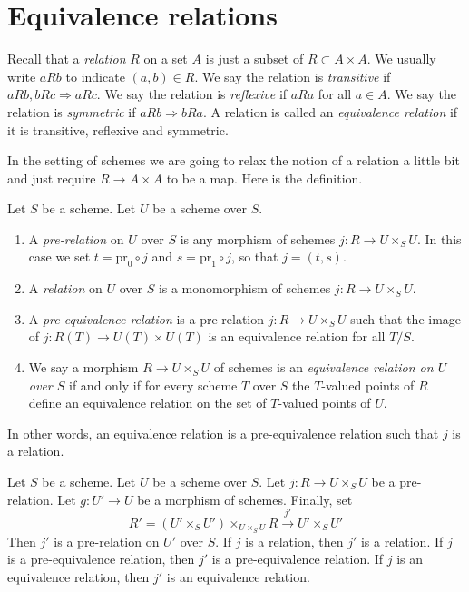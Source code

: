 \section{Equivalence relations}
\label{section-equivalence-relations}

\noindent
Recall that a {\it relation} $R$ on a set $A$ is just a subset
of $R \subset A \times A$. We usually write $a R b$ to indicate
$(a, b) \in R$. We say the relation is {\it transitive} if
$a R b, b R c \Rightarrow a R c$. We say the relation is
{\it reflexive} if $a R a$ for all $a \in A$. We say the relation is
{\it symmetric} if $a R b \Rightarrow b R a$.
A relation is called an {\it equivalence relation} if
it is transitive, reflexive and symmetric.

\medskip\noindent
In the setting of schemes we are going to relax the notion of a
relation a little bit and just require $R \to A \times A$ to
be a map. Here is the definition.

\begin{definition}
\label{definition-equivalence-relation}
Let $S$ be a scheme. Let $U$ be a scheme over $S$.
\begin{enumerate}
\item A {\it pre-relation} on $U$ over $S$ is any morphism
of schemes $j : R \to U \times_S U$. In this case we set
$t = \text{pr}_0 \circ j$ and $s = \text{pr}_1 \circ j$, so
that $j = (t, s)$.
\item A {\it relation} on $U$ over $S$ is a monomorphism
of schemes $j : R \to U \times_S U$.
\item A {\it pre-equivalence relation} is a pre-relation
$j : R \to U \times_S U$ such that the image of
$j : R(T) \to U(T) \times U(T)$ is an equivalence relation for
all $T/S$.
\item We say a morphism $R \to U \times_S U$ of schemes is
an {\it equivalence relation on $U$ over $S$}
if and only if for every scheme $T$ over $S$ the $T$-valued
points of $R$ define an equivalence relation
on the set of $T$-valued points of $U$.
\end{enumerate}
\end{definition}

\noindent
In other words, an equivalence relation is a pre-equivalence relation
such that $j$ is a relation.

\begin{lemma}
\label{lemma-restrict-relation}
Let $S$ be a scheme.
Let $U$ be a scheme over $S$.
Let $j : R \to U \times_S U$ be a pre-relation.
Let $g : U' \to U$ be a morphism of schemes.
Finally, set
$$
R' = (U' \times_S U')\times_{U \times_S U} R
\xrightarrow{j'}
U' \times_S U'
$$
Then $j'$ is a pre-relation on $U'$ over $S$.
If $j$ is a relation, then $j'$ is a relation.
If $j$ is a pre-equivalence relation, then $j'$ is a pre-equivalence relation.
If $j$ is an equivalence relation, then $j'$ is an equivalence relation.
\end{lemma}

